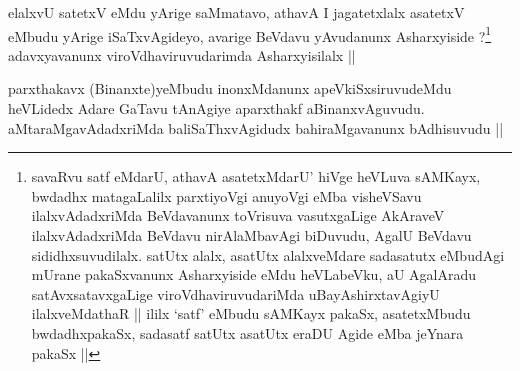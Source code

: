 \begin{artha}
elalxvU satetxV eMdu yArige saMmatavo, athavA I jagatetxlalx asatetxV eMbudu yArige iSaTxvAgideyo, avarige BeVdavu yAvudanunx Asharxyiside ?\footnote{savaRvu satf eMdarU, athavA asatetxMdarU' hiVge heVLuva sAMKayx, bwdadhx matagaLalilx parxtiyoVgi anuyoVgi eMba visheVSavu ilalxvAdadxriMda BeVdavanunx toVrisuva vasutxgaLige AkAraveV ilalxvAdadxriMda BeVdavu nirAlaMbavAgi biDuvudu, AgalU BeVdavu sididhxsuvudilalx. satUtx alalx, asatUtx alalxveMdare sadasatutx eMbudAgi mUrane pakaSxvanunx Asharxyiside eMdu heVLabeVku, aU AgalAradu satAvxsatavxgaLige viroVdhaviruvudariMda uBayAshirxtavAgiyU ilalxveMdathaR || ililx `satf' eMbudu sAMKayx pakaSx, asatetxMbudu bwdadhxpakaSx, sadasatf satUtx asatUtx eraDU Agide eMba jeYnara pakaSx ||} adavxyavanunx viroVdhaviruvudarimda Asharxyisilalx ||
\end{artha}


\begin{artha}
parxthakavx (Binanxte)yeMbudu inonxMdanunx apeVkiSxsiruvudeMdu heVLidedx Adare GaTavu tAnAgiye aparxthakf aBinanxvAguvudu. aMtaraMgavAdadxriMda baliSaThxvAgidudx bahiraMgavanunx bAdhisuvudu ||
\end{artha}

